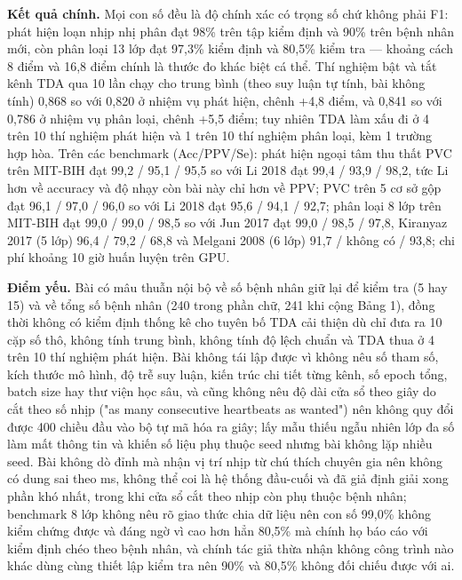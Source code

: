 \documentclass[12pt,a4paper]{article}
\begin{document}
\noindent \textbf{Kết quả chính.} Mọi con số đều là độ chính xác có trọng số chứ không phải F1: phát hiện loạn nhịp nhị phân đạt 98\% trên tập kiểm định và 90\% trên bệnh nhân mới, còn phân loại 13 lớp đạt 97,3\% kiểm định và 80,5\% kiểm tra — khoảng cách 8 điểm và 16,8 điểm chính là thước đo khác biệt cá thể. Thí nghiệm bật và tắt kênh TDA qua 10 lần chạy cho trung bình (theo suy luận tự tính, bài không tính) 0,868 so với 0,820 ở nhiệm vụ phát hiện, chênh +4,8 điểm, và 0,841 so với 0,786 ở nhiệm vụ phân loại, chênh +5,5 điểm; tuy nhiên TDA làm xấu đi ở 4 trên 10 thí nghiệm phát hiện và 1 trên 10 thí nghiệm phân loại, kèm 1 trường hợp hòa. Trên các benchmark (Acc/PPV/Se): phát hiện ngoại tâm thu thất PVC trên MIT-BIH đạt 99,2 / 95,1 / 95,5 so với Li 2018 đạt 99,4 / 93,9 / 98,2, tức Li hơn về accuracy và độ nhạy còn bài này chỉ hơn về PPV; PVC trên 5 cơ sở gộp đạt 96,1 / 97,0 / 96,0 so với Li 2018 đạt 95,6 / 94,1 / 92,7; phân loại 8 lớp trên MIT-BIH đạt 99,0 / 99,0 / 98,5 so với Jun 2017 đạt 99,0 / 98,5 / 97,8, Kiranyaz 2017 (5 lớp) 96,4 / 79,2 / 68,8 và Melgani 2008 (6 lớp) 91,7 / không có / 93,8; chi phí khoảng 10 giờ huấn luyện trên GPU.\par\vspace{3pt}
\noindent \textbf{Điểm yếu.} Bài có mâu thuẫn nội bộ về số bệnh nhân giữ lại để kiểm tra (5 hay 15) và về tổng số bệnh nhân (240 trong phần chữ, 241 khi cộng Bảng 1), đồng thời không có kiểm định thống kê cho tuyên bố TDA cải thiện dù chỉ đưa ra 10 cặp số thô, không tính trung bình, không tính độ lệch chuẩn và TDA thua ở 4 trên 10 thí nghiệm phát hiện. Bài không tái lập được vì không nêu số tham số, kích thước mô hình, độ trễ suy luận, kiến trúc chi tiết từng kênh, số epoch tổng, batch size hay thư viện học sâu, và cũng không nêu độ dài cửa sổ theo giây do cắt theo số nhịp ("as many consecutive heartbeats as wanted") nên không quy đổi được 400 chiều đầu vào bộ tự mã hóa ra giây; lấy mẫu thiếu ngẫu nhiên lớp đa số làm mất thông tin và khiến số liệu phụ thuộc seed nhưng bài không lặp nhiều seed. Bài không dò đỉnh mà nhận vị trí nhịp từ chú thích chuyên gia nên không có dung sai theo ms, không thể coi là hệ thống đầu-cuối và đã giả định giải xong phần khó nhất, trong khi cửa sổ cắt theo nhịp còn phụ thuộc bệnh nhân; benchmark 8 lớp không nêu rõ giao thức chia dữ liệu nên con số 99,0\% không kiểm chứng được và đáng ngờ vì cao hơn hẳn 80,5\% mà chính họ báo cáo với kiểm định chéo theo bệnh nhân, và chính tác giả thừa nhận không công trình nào khác dùng cùng thiết lập kiểm tra nên 90\% và 80,5\% không đối chiếu được với ai.\par\vspace{3pt}
\end{document}
